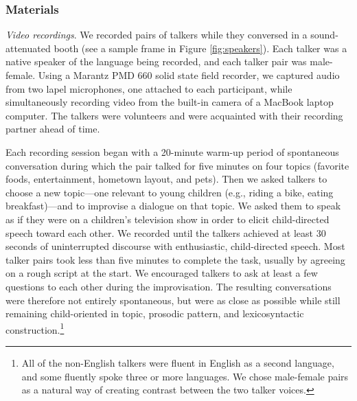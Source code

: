 \documentclass[authoryear, 12pt]{elsarticle}
\begin{document}
\subsubsection*{Materials}

\textit{Video recordings}. We recorded pairs of talkers while they conversed in a sound-attenuated booth (see a sample frame in Figure \ref{fig:speakers}). Each talker was a native speaker of the language being recorded, and each talker pair was male-female. Using a Marantz PMD 660 solid state field recorder, we captured audio from two lapel microphones, one attached to each participant, while simultaneously recording video from the built-in camera of a MacBook laptop computer. The talkers were volunteers and were acquainted with their recording partner ahead of time. 

Each recording session began with a 20-minute warm-up period of spontaneous conversation during which the pair talked for five minutes on four topics (favorite foods, entertainment, hometown layout, and pets). Then we asked talkers to choose a new topic---one relevant to young children (e.g., riding a bike, eating breakfast)---and to improvise a dialogue on that topic. We asked them to speak as if they were on a children's television show in order to elicit child-directed speech toward each other. We recorded until the talkers achieved at least 30 seconds of uninterrupted discourse with enthusiastic, child-directed speech. Most talker pairs took less than five minutes to complete the task, usually by agreeing on a rough script at the start. We encouraged talkers to ask at least a few questions to each other during the improvisation. The resulting conversations were therefore not entirely spontaneous, but were as close as possible while still remaining child-oriented in topic, prosodic pattern, and lexicosyntactic construction.\footnote{All of the non-English talkers were fluent in English as a second language, and some fluently spoke three or more languages. We chose male-female pairs as a natural way of creating contrast between the two talker voices.}
\end{document}
